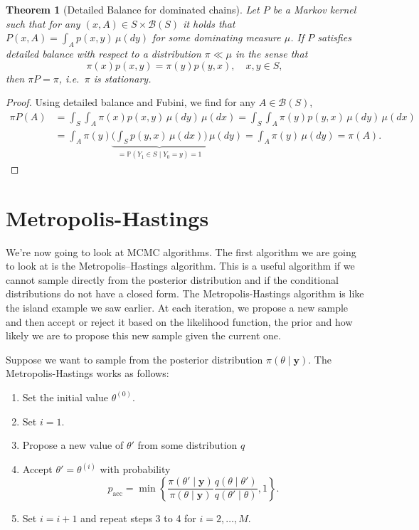 \documentclass[
]{book}
\newtheorem{theorem}{Theorem}[chapter]
\theoremstyle{definition}
\theoremstyle{definition}
\theoremstyle{definition}
\theoremstyle{definition}
\theoremstyle{remark}
\begin{document}
\begin{theorem}[Detailed Balance for dominated chains]\label{theo:reversibility}
Let \(P\) be a Markov kernel such that for any \((x,A) \in S \times \mathcal{B}(S)\) it holds that \(P(x,A) = \int_A p(x,y) \,\mu(dy)\) for some dominating measure \(\mu\). If \(P\)  satisfies detailed balance with respect to a distribution \(\pi \ll \mu\) in the sense that 
\[\pi(x)p(x,y) = \pi(y)p(y,x), \quad x,y \in S,\]
then \(\pi P = \pi\), i.e.\, \(\pi\) is stationary.
\end{theorem}

\begin{proof}
Using detailed balance and Fubini, we find for any \(A \in \mathcal{B}(S)\), 
\begin{align*} 
\pi P(A) &= \int_S \int_A \pi(x) p(x,y) \, \mu(dy)\, \mu(dx) =\int_S \int_A \pi(y) p(y,x) \, \mu(dy)\, \mu(dx)\\
&= \int_A \pi(y) \underbrace{\Big(\int_S p(y,x) \, \mu(dx)\Big)}_{= \mathbb{P}(Y_1 \in S \mid Y_0 = y) = 1} \, \mu(dy) = \int_A \pi(y) \, \mu(dy) = \pi(A). 
\end{align*}
\end{proof}

\hypertarget{metropolis-hastings}{%
\section{Metropolis-Hastings}\label{metropolis-hastings}}

We're now going to look at MCMC algorithms. The first algorithm we are going to look at is the Metropolis--Hastings algorithm. This is a useful algorithm if we cannot sample directly from the posterior distribution and if the conditional distributions do not have a closed form. The Metropolis-Hastings algorithm is like the island example we saw earlier. At each iteration, we propose a new sample and then accept or reject it based on the likelihood function, the prior and how likely we are to propose this new sample given the current one.

Suppose we want to sample from the posterior distribution \(\pi(\theta \mid \boldsymbol{y})\). The Metropolis-Hastings works as follows:

\begin{enumerate}
\def\labelenumi{\arabic{enumi}.}
\item
  Set the initial value \(\theta^{(0)}\).
\item
  Set \(i = 1\).
\item
  Propose a new value of \(\theta'\) from some distribution \(q\)
\item
  Accept \(\theta' = \theta^{(i)}\) with probability
  \[
  p_{\textrm{acc}} = \min\left\{\frac{\pi(\theta' \mid \boldsymbol{y})}{\pi(\theta \mid \boldsymbol{y})}\frac{q(\theta \mid \theta')}{q(\theta' \mid \theta)}, 1\right\}.
  \]
\item
  Set \(i = i+1\) and repeat steps 3 to 4 for \(i = 2, \ldots, M\).
\end{enumerate}
\end{document}
